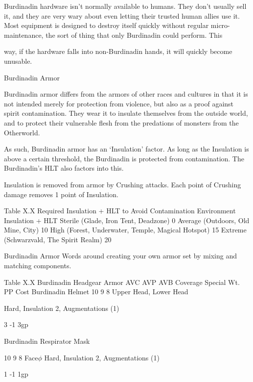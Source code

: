 \documentclass[oneside,11pt,english]{book}
\begin{document}
 

Burdinadin hardware isn’t normally available to humans. They don’t usually sell it, and they are very 
wary about even letting their trusted human allies use it. Most equipment is designed to destroy itself 
quickly without regular micro-maintenance, the sort of thing that only Burdinadin could perform. This 


way, if the hardware falls into non-Burdinadin hands, it will quickly become unusable. 

 

Burdinadin Armor 

 

Burdinadin armor differs from the armors of other races and cultures in that it is not intended merely for 
protection from violence, but also as a proof against spirit contamination. They wear it to insulate 
themselves from the outside world, and to protect their vulnerable flesh from the predations of monsters 
from the Otherworld. 

 

As such, Burdinadin armor has an ‘Insulation’ factor. As long as the Insulation is above a certain 
threshold, the Burdinadin is protected from contamination. The Burdinadin’s HLT also factors into this. 

 

Insulation is removed from armor by Crushing attacks. Each point of Crushing damage removes 1 point 
of Insulation. 

 
Table X.X Required Insulation + HLT to Avoid Contamination 
Environment Insulation + HLT 
Sterile (Glade, Iron Tent, Deadzone) 0 
Average (Outdoors, Old Mine, City) 10 
High (Forest, Underwater, Temple, Magical Hotspot) 15 
Extreme (Schwarzvald, The Spirit Realm) 20 

 

 

Burdinadin Armor 
Words around creating your own armor set by mixing and matching components. 

 

Table X.X Burdinadin Headgear 
Armor AVC AVP AVB Coverage Special Wt. PP Cost 
Burdinadin Helmet 10 9 8 Upper Head, 
Lower Head 

Hard, Insulation 2, 
Augmentations (1) 

3 -1 3gp 

Burdinadin 
Respirator Mask 

10 9 8 Face$\phi$ Hard, Insulation 2, 
Augmentations (1) 

1 -1 1gp 
\end{document}
